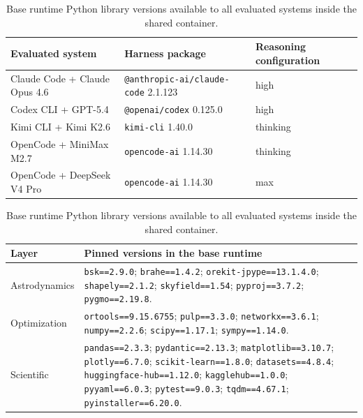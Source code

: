 \documentclass[11pt]{article}
\begin{document}
\begin{table}[!t]
\centering
\begingroup
\footnotesize
\setlength{\tabcolsep}{5pt}
\begin{tabular}{>{\raggedright\arraybackslash}p{}>{\raggedright\arraybackslash}p{}>{\raggedright\arraybackslash}p{}}
\hline
\textbf{Evaluated system} & \textbf{Harness package} & \textbf{Reasoning configuration} \\
\hline
Claude Code + Claude Opus 4.6 & \texttt{@anthropic-ai/claude-code} 2.1.123 & high \\
Codex CLI + GPT-5.4 & \texttt{@openai/codex} 0.125.0 & high \\
Kimi CLI + Kimi K2.6 & \texttt{kimi-cli} 1.40.0 & thinking \\
OpenCode + MiniMax M2.7 & \texttt{opencode-ai} 1.14.30 & thinking \\
OpenCode + DeepSeek V4 Pro & \texttt{opencode-ai} 1.14.30 & max \\
\hline
\end{tabular}
\caption{Harness package and reasoning configuration for the five evaluated systems. Versions are taken from the shared base runtime.}
\label{tab:agent-system-versions}
\endgroup

\vspace{0.75\baselineskip}

\begingroup
\small
\setlength{\tabcolsep}{4pt}
\begin{tabular}{>{\raggedright\arraybackslash}p{}>{\raggedright\arraybackslash}p{}}
\hline
\textbf{Layer} & \textbf{Pinned versions in the base runtime} \\
\hline
Astrodynamics & \texttt{bsk==2.9.0}; \texttt{brahe==1.4.2}; \texttt{orekit-jpype==13.1.4.0}; \texttt{shapely==2.1.2}; \texttt{skyfield==1.54}; \texttt{pyproj==3.7.2}; \texttt{pygmo==2.19.8}. \\
Optimization & \texttt{ortools==9.15.6755}; \texttt{pulp==3.3.0}; \texttt{networkx==3.6.1}; \texttt{numpy==2.2.6}; \texttt{scipy==1.17.1}; \texttt{sympy==1.14.0}. \\
Scientific & \texttt{pandas==2.3.3}; \texttt{pydantic==2.13.3}; \texttt{matplotlib==3.10.7}; \texttt{plotly==6.7.0}; \texttt{scikit-learn==1.8.0}; \texttt{datasets==4.8.4}; \texttt{huggingface-hub==1.12.0}; \texttt{kagglehub==1.0.0}; \texttt{pyyaml==6.0.3}; \texttt{pytest==9.0.3}; \texttt{tqdm==4.67.1}; \texttt{pyinstaller==6.20.0}. \\
\hline
\end{tabular}
\caption{Base runtime Python library versions available to all evaluated systems inside the shared container.}
\label{tab:runtime-library-versions}
\endgroup
\end{table}
\end{document}

